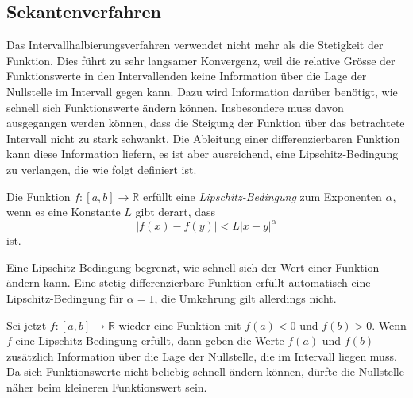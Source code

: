 %
%
\subsection{Sekantenverfahren
\label{buch:subsection:sekanten}}
Das Intervallhalbierungsverfahren verwendet nicht mehr als die
Stetigkeit der Funktion.
%
Dies führt zu sehr langsamer Konvergenz, weil die relative Grösse
der Funktionswerte in den Intervallenden keine Information über die
Lage der Nullstelle im Intervall gegen kann.
Dazu wird Information darüber benötigt, wie schnell sich Funktionswerte
ändern können.
Insbesondere muss davon ausgegangen werden können, dass die Steigung
der Funktion über das betrachtete Intervall nicht zu stark schwankt.
Die Ableitung einer differenzierbaren Funktion kann diese Information
liefern, es ist aber ausreichend, eine Lipschitz-Bedingung zu verlangen,
die wie folgt definiert ist.
%

\begin{definition}
\label{buch:definition:lipshitz}
Die Funktion $f\colon[a,b]\to\mathbb R$ erfüllt eine {\em Lipschitz-Bedingung}
zum Exponenten $\alpha$, wenn es eine Konstante $L$ gibt derart, dass
\[
|f(x)-f(y)|
<
L|x-y|^\alpha
\]
ist.
\end{definition}

Eine Lipschitz-Bedingung begrenzt, wie schnell sich der Wert
einer Funktion ändern kann.
Eine stetig differenzierbare Funktion erfüllt automatisch eine
Lipschitz-Bedingung für $\alpha=1$, die Umkehrung gilt allerdings
nicht.

Sei jetzt $f\colon[a,b]\to\mathbb R$ wieder eine Funktion mit
$f(a)<0$ und $f(b) > 0$.
Wenn $f$ eine Lipschitz-Bedingung erfüllt, dann geben die
Werte $f(a)$ und $f(b)$ zusätzlich Information über die Lage
der Nullstelle, die im Intervall liegen muss.
Da sich Funktionswerte nicht beliebig schnell ändern können,
dürfte die Nullstelle näher beim kleineren Funktionswert sein.

